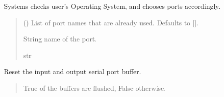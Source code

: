 \documentclass[letterpaper,10pt,english]{sphinxmanual}
\begin{document}
\begin{fulllineitems}
\begin{fulllineitems}
\end{fulllineitems}


\begin{fulllineitems}
\label{\detokenize{PodApi.Devices:PodApi.Devices.BasicPodProtocol.Pod.ChoosePort}}
\pysigstartsignatures
{}
\pysigstopsignatures
\sphinxAtStartPar
Systems checks user’s Operating System, and chooses ports accordingly.
\begin{quote}\begin{description}
\sphinxAtStartPar
{} (\sphinxstyleliteralemphasis{\sphinxupquote{{[}}}\sphinxstyleliteralemphasis{\sphinxupquote{{]}}}\sphinxstyleliteralemphasis{\sphinxupquote{, }}) \textendash{} List of port names that are already used. Defaults to {[}{]}.

\sphinxAtStartPar
String name of the port.

\sphinxAtStartPar
str

\end{description}\end{quote}

\end{fulllineitems}


\begin{fulllineitems}
\label{\detokenize{PodApi.Devices:PodApi.Devices.BasicPodProtocol.Pod.FlushPort}}
\pysigstartsignatures
{}
\pysigstopsignatures
\sphinxAtStartPar
Reset the input and output serial port buffer.
\begin{quote}\begin{description}
\sphinxAtStartPar
True of the buffers are flushed, False otherwise.


\end{description}
\end{quote}
\end{fulllineitems}
\end{fulllineitems}
\end{document}
